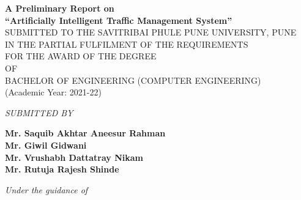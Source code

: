\documentclass[openany,12pt]{report}
\begin{document}
	\lhead{}
	\chead{}
	\setlength{\headrulewidth}{0.4pt}
	\setlength{\footrulewidth}{0.4pt}
	\fontsize{12}{15}
	\begin{titlepage}
		\begin{center}
			{\bf A Preliminary Report on} \\
			\vspace{0.3in}
			{\Large \bf ``Artificially Intelligent Traffic Management System''}\\
			\vspace{0.3in}
			SUBMITTED TO THE SAVITRIBAI PHULE PUNE UNIVERSITY, PUNE\\
			IN THE PARTIAL FULFILMENT OF THE REQUIREMENTS \\
			FOR THE AWARD OF THE DEGREE \\
			\vspace{0.2in}
			OF\\  
			\vspace{0.2in}
			BACHELOR OF ENGINEERING (COMPUTER ENGINEERING)\\
			(Academic Year: 2021-22)\\
			\vspace{0.2in}
			
			{\it SUBMITTED BY}\\
			
			\vspace{0.2in}
			
			{\bf Mr. Saquib Akhtar Aneesur Rahman}\hspace*{\fill}{\bf (Exam Seat No. B150474298)}\\
			{\bf Mr. Giwil Gidwani }\hspace*{\fill}{\bf (Exam Seat No. B150474245)}\\
			{\bf Mr. Vrushabh Dattatray Nikam     }\hspace*{\fill}{\bf (Exam Seat No. B150474278)}\\
			{\bf Mr. Rutuja Rajesh Shinde    }\hspace*{\fill}{\bf (Exam Seat No. B150474304)}\\
			
			\vspace{0.4in}
			
			{\it Under the guidance of}\\
			
			\vspace{0.1in}
			

\end{center}
\end{titlepage}
\end{document}
